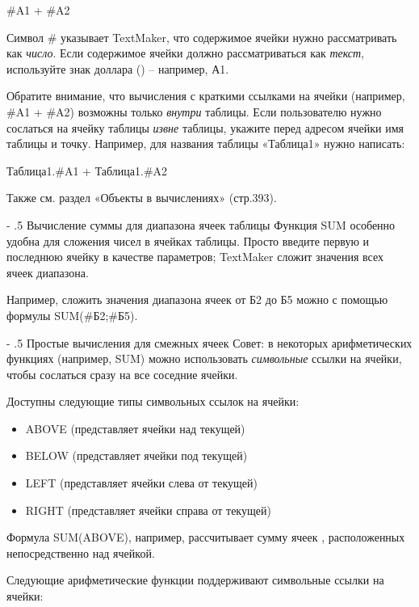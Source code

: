 ﻿\documentclass[a4paper,10pt]{article}
\makeatletter
\renewcommand\paragraph{%
   \@startsection{paragraph}{4}{0mm}%
      {-\baselineskip}%
      {.5\baselineskip}%
      {\normalfont\normalsize\bfseries}}
\makeatother
\begin{document}
\#A1 + \#A2

Символ \# указывает TextMaker, что содержимое ячейки нужно рассматривать как \textit{число}. Если содержимое ячейки должно рассматриваться как \textit{текст}, используйте знак доллара (\textdollar) -- например, \textdollar А1.

Обратите внимание, что вычисления с краткими ссылками на ячейки (например, \#A1 + \#A2) возможны только \textit{внутри} таблицы. Если пользователю нужно сослаться на ячейку таблицы \textit{извне} таблицы, укажите перед адресом ячейки имя таблицы и точку. Например, для названия таблицы «Таблица1» нужно написать:

Таблица1.\#A1 + Таблица1.\#A2

Также см. раздел «Объекты в вычислениях» (стр.393).

\paragraph{Вычисление суммы для диапазона ячеек таблицы}
Функция SUM особенно удобна для сложения чисел в ячейках таблицы. Просто введите первую и последнюю ячейку в качестве параметров; TextMaker сложит значения всех ячеек диапазона.

Например, сложить значения диапазона ячеек от Б2 до Б5 можно с помощью формулы SUM(\#Б2;\#Б5).

\paragraph{Простые вычисления для смежных ячеек}
Совет: в некоторых арифметических функциях (например, SUM) можно использовать \textit{символьные} ссылки на ячейки, чтобы сослаться сразу на все соседние ячейки.

Доступны следующие типы символьных ссылок на ячейки:
\begin{itemize}
 \item ABOVE (представляет ячейки над текущей)
 \item BELOW (представляет ячейки под текущей)
 \item LEFT (представляет ячейки слева от текущей)
 \item RIGHT (представляет ячейки справа от текущей)
\end{itemize}

Формула SUM(ABOVE), например, рассчитывает сумму ячеек , расположенных непосредственно над ячейкой.

Следующие арифметические функции поддерживают символьные ссылки на ячейки:
\end{document}

